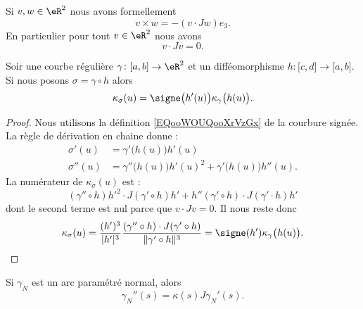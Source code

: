 Si \( v,w\in \eR^2\) nous avons formellement
\begin{equation}
	v\times w=-(v\cdot Jw)e_3.
\end{equation}
En particulier pour tout \( v\in \eR^2\) nous avons
\begin{equation}
	v\cdot Jv=0.
\end{equation}

\begin{lemma}
	Soir une courbe régulière \( \gamma\colon \mathopen[ a , b \mathclose]\to \eR^2\) et un difféomorphisme \( h\colon \mathopen[ c , d \mathclose]\to \mathopen[ a , b \mathclose]\). Si nous posons \( \sigma=\gamma\circ h\) alors
	\begin{equation}        \label{EQooSQNMooUKGhPd}
		\kappa_{\sigma}(u)=\signe\big( h'(u) \big)\kappa_{\gamma}\big( h(u) \big).
	\end{equation}
\end{lemma}

\begin{proof}
	Nous utilisons la définition \eqref{EQooWOUQooXrVzGx} de la courbure signée. La règle de dérivation en chaine donne :
	\begin{subequations}
		\begin{align}
			\sigma'(u)  & =\gamma'\big( h(u) \big)h'(u)                                   \\
			\sigma''(u) & =\gamma''\big( h(u) \big)h'(u)^2+\gamma'\big( h(u) \big)h''(u).
		\end{align}
	\end{subequations}
	La numérateur de \( \kappa_{\sigma}(u)\) est :
	\begin{equation}
		(\gamma''\circ h)h'^2\cdot J(\gamma'\circ h)h'+h''(\gamma'\circ h)\cdot J(\gamma'\cdot h)h'
	\end{equation}
	dont le second terme est nul parce que \( v\cdot Jv=0\). Il nous reste donc
	\begin{equation}
		\kappa_{\sigma}(u)=\frac{ (h')^3 }{ | h' |^3} \frac{ (\gamma''\circ h)\cdot J(\gamma'\circ h) }{ \| \gamma'\circ h \|^3 }=\signe(h')\kappa_{\gamma}\big( h(u) \big).
	\end{equation}
\end{proof}

\begin{lemma}        \label{LEMooKPORooEGJCRm}
	Si \( \gamma_N\) est un arc paramétré normal, alors
	\begin{equation}
		\gamma_N''(s)=\kappa(s)J\gamma_N'(s).
	\end{equation}
\end{lemma}

